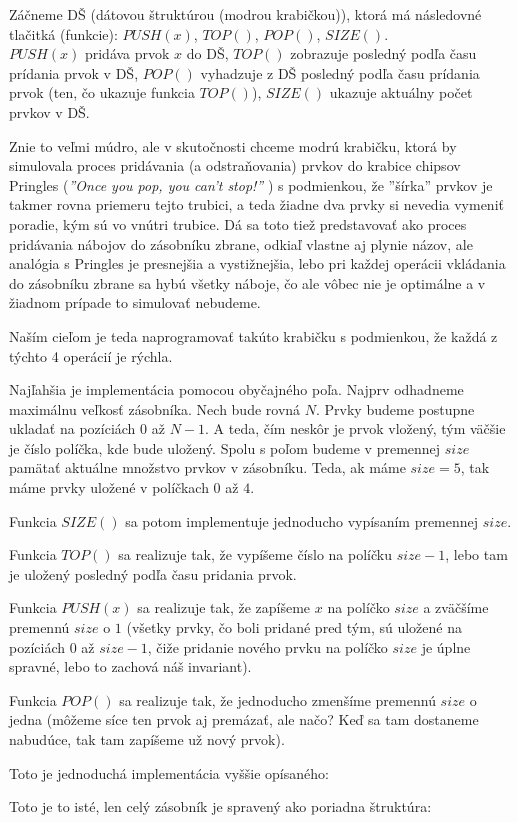 Záčneme DŠ (dátovou štruktúrou (modrou krabičkou)), ktorá má následovné tlačitká 
(funkcie): 
$PUSH(x)$, $TOP()$, $POP()$, $SIZE()$. \\
$PUSH(x)$ pridáva prvok $x$ do DŠ, $TOP()$ zobrazuje posledný podľa času 
prídania prvok v DŠ, $POP()$ vyhadzuje z DŠ posledný podľa času prídania prvok 
(ten, čo ukazuje funkcia $TOP()$), $SIZE()$ ukazuje aktuálny počet prvkov v DŠ.

Znie to veľmi múdro, ale v skutočnosti chceme modrú krabičku, ktorá by simulovala 
proces pridávania (a odstraňovania) prvkov do krabice chipsov Pringles (\textit{''Once 
you pop, you can't stop!''} ) s podmienkou, že ''šírka'' prvkov je takmer
rovna priemeru tejto trubici, a teda žiadne dva prvky si nevedia vymeniť poradie, 
kým sú vo vnútri trubice. Dá sa toto tiež predstavovať ako proces pridávania 
nábojov do zásobníku zbrane, odkiaľ vlastne aj plynie názov, ale analógia s Pringles
je presnejšia a vystižnejšia, lebo pri každej operácii vkládania do zásobníku zbrane sa 
hybú všetky náboje, čo ale vôbec nie je optimálne a v žiadnom prípade to simulovať nebudeme. 

Naším cieľom je teda naprogramovať takúto krabičku s podmienkou, že každá z 
týchto 4 operácií je rýchla. 

\medskip

Najľahšia je implementácia pomocou obyčajného poľa. Najprv odhadneme maximálnu veľkosť 
zásobníka. Nech bude rovná $N$. Prvky budeme postupne ukladať na pozíciách $0$ až $N-1$. 
A teda, čím neskôr je prvok vložený, tým väčšie je číslo políčka, kde bude uložený.
Spolu s poľom budeme v premennej $size$ pamätať aktuálne množstvo prvkov v zásobníku.
Teda, ak máme $size = 5$, tak máme prvky uložené v políčkach $0$ až $4$.
   
Funkcia $SIZE()$ sa potom implementuje jednoducho vypísaním premennej $size$.

Funkcia $TOP()$ sa realizuje tak, že vypíšeme číslo na políčku $size-1$, 
lebo tam je uložený posledný podľa času pridania prvok.

Funkcia $PUSH(x)$ sa realizuje tak, že zapíšeme $x$ na políčko $size$ a zväčšíme premennú $size$ 
o $1$ (všetky prvky, čo boli pridané pred tým, sú uložené na pozíciách $0$ až 
$size-1$, čiže pridanie nového prvku na políčko $size$ je úplne spravné, lebo 
to zachová náš invariant). 

Funkcia $POP()$ sa realizuje tak, že jednoducho zmenšíme 
premennú $size$ o jedna (môžeme síce ten prvok aj premázať, ale načo? Keď sa 
tam dostaneme nabudúce, tak tam zapíšeme už nový prvok).

Toto je jednoduchá implementácia vyššie opísaného:

Toto je to isté, len celý zásobník je spravený ako poriadna štruktúra:


